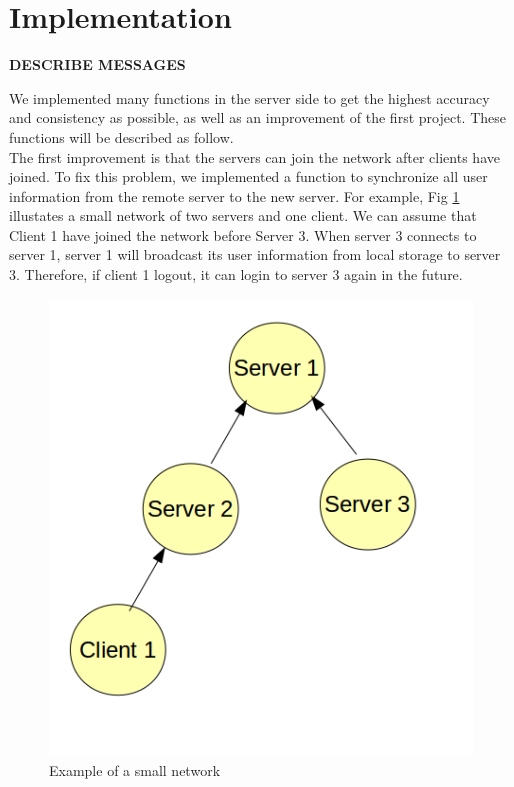 \documentclass[10pt,twocolumn]{article}
\begin{document}
\section{Implementation}
\textbf{DESCRIBE MESSAGES}

We implemented many functions in the server side to get the highest accuracy and consistency as possible, as well as an improvement of the first project. These functions will be described as follow. \\
	
The first improvement is that the servers can join the network after clients have joined. To fix this problem, we implemented a function to synchronize all user information from the remote server to the new server. For example, Fig \ref{toy} illustates a small network of two servers and one client. We can assume that Client 1 have joined the network before Server 3. When server 3 connects to server 1, server 1 will broadcast its user information from local storage to server 3. Therefore, if client 1 logout, it can login to server 3 again in the future.

\begin{figure}[h!]
\begin{center}
\includegraphics[scale=0.4]{toy_example}
\caption{Example of a small network}
\label{toy}	
\end{center}
\end{figure}
\end{document}
